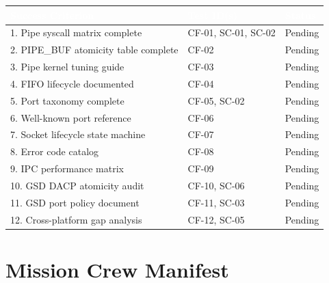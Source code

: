 \documentclass[11pt,letterpaper]{article}
\newcommand{\tableheader}[1]{\textbf{\sffamily\textcolor{white}{#1}}}
\begin{document}
\begin{center}
\begin{tabularx}{\textwidth}{XL{3cm}C{1.5cm}}
\toprule
{}
\tableheader{Success Criterion} & \tableheader{Test ID(s)} & \tableheader{Status} \\
. Pipe syscall matrix complete & CF-01, SC-01, SC-02 & Pending \\
2. PIPE\_BUF atomicity table complete & CF-02 & Pending \\
3. Pipe kernel tuning guide & CF-03 & Pending \\
4. FIFO lifecycle documented & CF-04 & Pending \\
5. Port taxonomy complete & CF-05, SC-02 & Pending \\
6. Well-known port reference & CF-06 & Pending \\
7. Socket lifecycle state machine & CF-07 & Pending \\
8. Error code catalog & CF-08 & Pending \\
9. IPC performance matrix & CF-09 & Pending \\
10. GSD DACP atomicity audit & CF-10, SC-06 & Pending \\
11. GSD port policy document & CF-11, SC-03 & Pending \\
12. Cross-platform gap analysis & CF-12, SC-05 & Pending \\
\bottomrule
\end{tabularx}
\end{center}

\section{Mission Crew Manifest}
\end{document}
